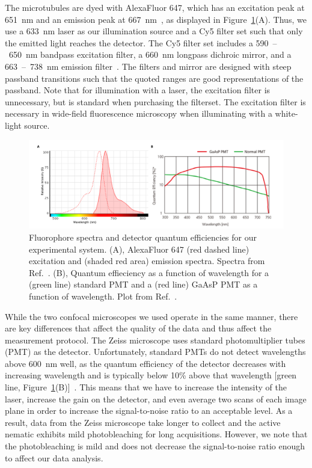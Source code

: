 The microtubules are dyed with AlexaFluor 647, which has an excitation peak at 651~nm and an emission peak at 667~nm~\cite{RN264}, as displayed in Figure~\ref{f:3-Spectra}(A).
Thus, we use a 633~nm laser as our illumination source and a Cy5 filter set such that only the emitted light reaches the detector.
The Cy5 filter set includes a 590~--~650~nm bandpass excitation filter, a 660~nm longpass dichroic mirror, and a 663~--~738~nm emission filter~\cite{RN263}.
The filters and mirror are designed with steep passband transitions such that the quoted ranges are good representations of the passband.
Note that for illumination with a laser, the excitation filter is unnecessary, but is standard when purchasing the filterset.
The excitation filter is necessary in wide-field fluorescence microscopy when illuminating with a white-light source.
\begin{figure}
  \centering
  \includegraphics{figures/C3/Ch3-Figs_Spectra.png}
  \caption{Fluorophore spectra and detector quantum efficiencies for our experimental system.
  (A), AlexaFluor 647 (red dashed line) excitation and (shaded red area) emission spectra.
  Spectra from Ref.~\cite{RN264}.
  (B), Quantum effieciency as a function of wavelength for a (green line) standard PMT and a (red line) GaAsP PMT as a function of wavelength.
  Plot from Ref.~\cite{RN263}.}\label{f:3-Spectra}
\end{figure}

While the two confocal microscopes we used operate in the same manner, there are key differences that affect the quality of the data and thus affect the measurement protocol.
The Zeiss microscope uses standard photomultiplier tubes (PMT) as the detector.
Unfortunately, standard PMTs do not detect wavelengths above 600~nm well, as the quantum efficiency of the detector decreases with increasing wavelength and is typically below 10\% above that wavelength [green line, Figure~\ref{f:3-Spectra}(B)]~\cite{RN263}.
This means that we have to increase the intensity of the laser, increase the gain on the detector, and even average two scans of each image plane in order to increase the signal-to-noise ratio to an acceptable level.
As a result, data from the Zeiss microscope take longer to collect and the active nematic exhibits mild photobleaching for long acquisitions.
However, we note that the photobleaching is mild and does not decrease the signal-to-noise ratio enough to affect our data analysis.

